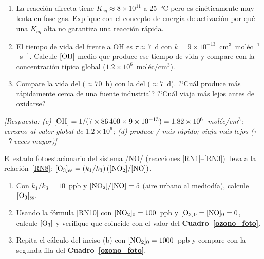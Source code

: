 \begin{bloque_ejercicios}
\begin{ejercicios}
\begin{enumerate}[label=\alph*)]
    \item La reacci\'on directa 
          tiene $K_{eq}\approx8\times10^{11}$ a \SI{25}{\celsius}
          pero es cin\'eticamente muy lenta en fase gas.
          Explique con el concepto de energ\'ia de activaci\'on
          por qu\'e una $K_{eq}$ alta no garantiza una
          reacci\'on r\'apida.

    \item El tiempo de vida del  frente a OH es
          $\tau\approx7$~d con
          $k = 9\times10^{-13}$~cm$^3$~mol\'ec$^{-1}$~s$^{-1}$.
          Calcule $[\ce{OH}]$ medio que produce ese tiempo
          de vida y compare con la concentraci\'on
          t\'ipica global ($1.2\times10^6$~mol\'ec/cm$^3$).

    \item Compare la vida del  ($\approx70$~h)
          con la del  ($\approx7$~d).
          ?`Cu\'al produce  m\'as r\'apidamente
          cerca de una fuente industrial?
          ?`Cu\'al viaja m\'as lejos antes de oxidarse?
\end{enumerate}

\textit{[Respuesta:
(c) $[\ce{OH}] = 1/(7\times86\,400\times9\times10^{-13})
    = 1.82\times10^6$~mol\'ec/cm$^3$;
    cercano al valor global de $1.2\times10^6$;
(d)  produce / m\'as r\'apido;
     viaja m\'as lejos ($\tau$~7 veces mayor)]}

\item El estado fotoestacionario del sistema
/NO/ (reacciones \ref{RN1}--\ref{RN3})
lleva a la relaci\'on~\ref{RN8}:
$[\ce{O3}]_\mathrm{ss} = (k_1/k_3)\,([\ce{NO2}]/[\ce{NO}])$.

\begin{enumerate}[label=\alph*)]
    \item Con $k_1/k_3 = 10$~ppb y
          $[\ce{NO2}]/[\ce{NO}] = 5$ (aire urbano al mediod\'ia),
          calcule $[\ce{O3}]_\mathrm{ss}$.

    \item Usando la f\'ormula \ref{RN10} con
          $[\ce{NO2}]_0 = 100$~ppb y
          $[\ce{O3}]_0 = [\ce{NO}]_0 = 0$,
          calcule $[\ce{O3}]$ y verifique que coincide con
          el valor del \textbf{Cuadro~\ref{ozono_foto}}.

    \item Repita el c\'alculo del inciso (b) con
          $[\ce{NO2}]_0 = 1000$~ppb y compare con la
          segunda fila del \textbf{Cuadro~\ref{ozono_foto}}.


\end{enumerate}
\end{ejercicios}
\end{bloque_ejercicios}
